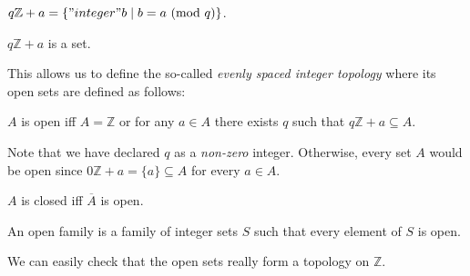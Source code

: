 \documentclass{article}
\renewcommand{\mod}{\text{mod }}
\newcommand{\Int}{\mathbb{Z}}
\begin{document}
  \begin{forthel}
    \begin{definition}[ArSeq]
      $q \Int + a = \{ "integer" b \mid b = a ~(\mod q) \}$.
    \end{definition}

    \begin{lemma}
      $q \Int + a$ is a set.
    \end{lemma}
  \end{forthel}

  This allows us to define the so-called \textit{evenly spaced integer topology} where its open sets are defined as follows:

  \begin{forthel}
    \begin{definition}[Open]
      $A$ is open iff $A = \Int$ or for any $a \in A$ there exists $q$ such that $q \Int + a \subseteq A$.
    \end{definition}
  \end{forthel}

  Note that we have declared $q$ as a \textit{non-zero} integer. Otherwise, every set $A$ would be open since $0 \Int + a = \{ a \} \subseteq A$ for every $a \in A$.

  \begin{forthel}
    \begin{definition}[Closed]
      $A$ is closed iff $\overline{A}$ is open.
    \end{definition}

    \begin{definition}[OpenIntegerSets]
      An open family is a family of integer sets $S$ such that every element of $S$ is open.
    \end{definition}
  \end{forthel}

  We can easily check that the open sets really form a topology on $\Int$.
\end{document}

